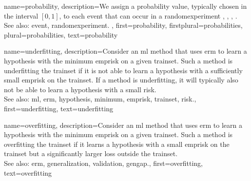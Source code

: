 {name={probability}, 
	description={We assign a probability value, typically chosen in the 
		interval $[0,1]$, to each \gls{event} that can occur in a \gls{randomexperiment}  
		\cite{BillingsleyProbMeasure}, \cite{BertsekasProb}, \cite{HalmosMeasure},  \cite{KallenbergBook}.
		\\
		See also: \gls{event}, \gls{randomexperiment}. },
	first={probability},
	firstplural={probabilities},
	plural={probabilities},
	text={probability}
}
	
{name={underfitting},
	description={Consider 
		an \gls{ml} method that uses \gls{erm} to learn a \gls{hypothesis} with the \gls{minimum} \gls{emprisk} 
		on a given \gls{trainset}. Such a method is underfitting the \gls{trainset} if it is 
		not able to learn a \gls{hypothesis} with a sufficiently small \gls{emprisk} on the \gls{trainset}. 
		If a method is underfitting, it will typically also not be able to learn a \gls{hypothesis} with 
		a small \gls{risk}.
					\\ 
		See also: \gls{ml}, \gls{erm}, \gls{hypothesis}, \gls{minimum}, \gls{emprisk}, \gls{trainset}, \gls{risk}.},
	first={underfitting},
	text={underfitting}
}

{name={overfitting},
	description={Consider an 
		\gls{ml} method that uses \gls{erm} to learn a \gls{hypothesis} with the \gls{minimum} \gls{emprisk} on 
		a given \gls{trainset}. Such a method is overfitting the \gls{trainset} if it learns 
		a \gls{hypothesis} with a small \gls{emprisk} on the \gls{trainset} but a significantly larger \gls{loss} outside the \gls{trainset}.
					\\ 
		See also: \gls{erm}, \gls{generalization}, \gls{validation}, \gls{gengap}.},
	first={overfitting},
	text={overfitting}
}


